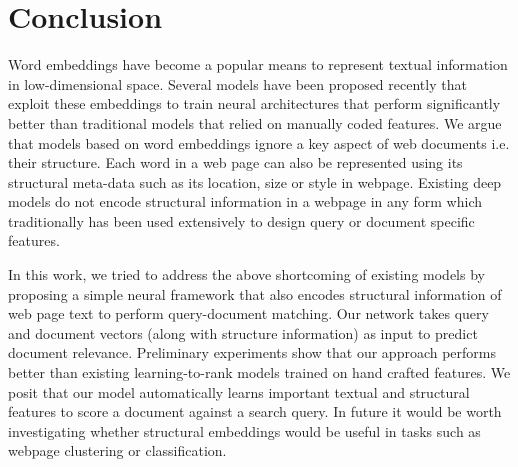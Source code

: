 \section{Conclusion}
\label{sec:conclusion}
Word embeddings have become a popular means to represent textual information in low-dimensional space. 
Several models have been proposed recently that exploit these embeddings to train neural architectures 
that perform significantly better than traditional models that relied on manually coded features. 
We argue that models based on word embeddings ignore a key aspect of web documents i.e. their structure. 
Each word in a web page can also be represented using its structural meta-data such as its location, size or 
style in webpage. Existing deep models do not encode structural information in a webpage in any form which 
traditionally has been used extensively to design query or document specific features. 

In this work, we tried to address the above shortcoming of existing models by proposing a simple 
neural framework that also encodes structural information of web page text to perform query-document matching. 
Our network takes query and document vectors (along with structure information) as input to predict document 
relevance. Preliminary experiments show that our approach performs better than existing learning-to-rank models 
trained on hand crafted features. We posit that our model automatically learns important textual 
and structural features to score a document against a search query. In future it would be worth 
investigating whether structural embeddings would be useful in tasks such 
as webpage clustering 
or classification.
